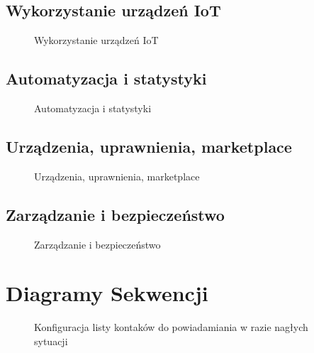 \documentclass{article}
\begin{document}
	\newpage
	\subsection{Wykorzystanie urządzeń IoT}
	\begin{figure}[H]
		\centering
		\noindent
		\captionsetup{labelformat=empty}
		\caption{Wykorzystanie urządzeń IoT}
	\end{figure}

	\newpage
	\subsection{Automatyzacja i statystyki}
	\begin{figure}[H]
		\centering
		\noindent
		\captionsetup{labelformat=empty}
		\caption{Automatyzacja i statystyki}
	\end{figure}

	\newpage
	\subsection{Urządzenia, uprawnienia, marketplace}
	\begin{figure}[H]
		\centering
		\noindent
		\captionsetup{labelformat=empty}
		\caption{Urządzenia, uprawnienia, marketplace}
	\end{figure}

	\newpage
	\subsection{Zarządzanie i bezpieczeństwo}
	\begin{figure}[H]
		\centering
		\noindent
		\captionsetup{labelformat=empty}
		\caption{Zarządzanie i bezpieczeństwo}
	\end{figure}

	\newpage

	\section{Diagramy Sekwencji}

	\begin{figure}[H]
		\centering
		\noindent
		\captionsetup{labelformat=empty}
		\caption{Konfiguracja listy kontaków do powiadamiania w razie nagłych
		sytuacji}
	\end{figure}
\end{document}
